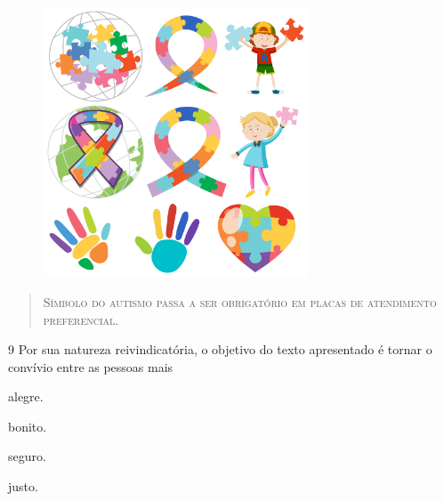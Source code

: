 \begin{figure}[H]
\centering\includegraphics[width=0.7\textwidth]{./imgSAEB_6_POR/freepik/PORT_6_IMG-12.jpeg}
\end{figure}

\begin{quote}
\centering\textsc{Símbolo do autismo passa a ser obrigatório em placas de atendimento
preferencial.}
\end{quote}

\num{9}  Por sua natureza reivindicatória, o objetivo do texto apresentado é
tornar o convívio entre as pessoas mais

\begin{escolha}
\item alegre.
\item bonito.
\item seguro.
\item justo.
\end{escolha}


